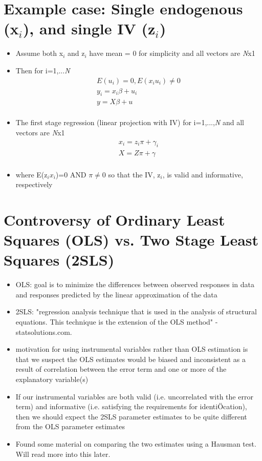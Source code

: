 \documentclass{article}
\begin{document}
\section{Example case: Single endogenous (x$_{i}$), and single IV (z$_{i}$)}
\begin{itemize}
  \item Assume both x$_{i}$ and z$_{i}$ have mean = 0 for simplicity and all vectors are \textit{N}x1
  \item Then for i=1,...\textit{N}
  \begin{equation} \label{eq1}
    \begin{split}
    E(u_{i})=0, E(x_{i}u_{i}) \neq 0  \\
    y_{i} = x_{i}\beta + u_{i} \\
    y=X\beta + u \\
    \end{split}
    \end{equation}
  \item The first stage regression (linear projection with IV) for i=1,...,\textit{N} and all vectors are \textit{N}x1 
  \begin{equation} \label{eq2}
      \begin{split}
      x_{i} = z_{i}\pi + \gamma_{i} \\
      X=Z\pi + \gamma \\
      \end{split}
      \end{equation}
  \item where E(z$_{i}x_{i}$)=0 AND $\pi \neq 0$ so that the IV, z$_{i}$, is valid and informative, respectively
\end{itemize}

\section{Controversy of Ordinary Least Squares (OLS) vs. Two Stage Least Squares (2SLS)}
  \begin{itemize}
  \item OLS: goal is to minimize the differences between observed responses in data and responses predicted by the linear approximation of the data
  \item 2SLS: "regression analysis technique that is used in the analysis of structural equations. This technique is the extension of the OLS method" - statsolutions.com.
  \item motivation for using instrumental variables rather than OLS estimation is that we suspect the OLS estimates would be biased and inconsistent as a result of correlation between the error term and one or more of the explanatory variable(s)
  \item If our instrumental variables are both valid (i.e. uncorrelated with the error
  term) and informative (i.e. satisfying the requirements for identiÖcation), then we should expect the 2SLS parameter estimates to be quite different from the OLS parameter estimates
  \item Found some material on comparing the two estimates using a Hausman test. Will read more into this later.
  \end{itemize}
  
\end{document}
